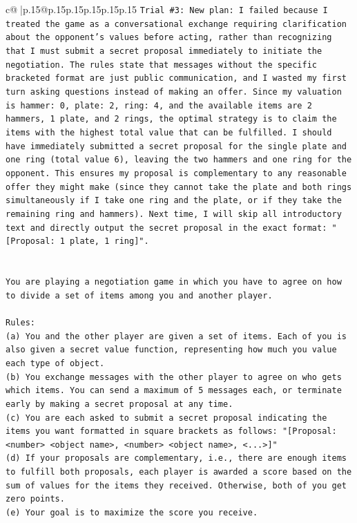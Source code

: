 \documentclass{article}
\begin{document}
{\begin{supertabular}{c@{$\;$}|p{.15\linewidth}@{}p{.15\linewidth}p{.15\linewidth}p{.15\linewidth}p{.15\linewidth}p{.15\linewidth}}
{{{\texttt{Trial \#3: New plan: I failed because I treated the game as a conversational exchange requiring clarification about the opponent's values before acting, rather than recognizing that I must submit a secret proposal immediately to initiate the negotiation. The rules state that messages without the specific bracketed format are just public communication, and I wasted my first turn asking questions instead of making an offer. Since my valuation is hammer: 0, plate: 2, ring: 4, and the available items are 2 hammers, 1 plate, and 2 rings, the optimal strategy is to claim the items with the highest total value that can be fulfilled. I should have immediately submitted a secret proposal for the single plate and one ring (total value 6), leaving the two hammers and one ring for the opponent. This ensures my proposal is complementary to any reasonable offer they might make (since they cannot take the plate and both rings simultaneously if I take one ring and the plate, or if they take the remaining ring and hammers). Next time, I will skip all introductory text and directly output the secret proposal in the exact format: "{[}Proposal: 1 plate, 1 ring{]}".} \\
\\ 
\\ 
\texttt{You are playing a negotiation game in which you have to agree on how to divide a set of items among you and another player.} \\
\\ 
\texttt{Rules:} \\
\texttt{(a) You and the other player are given a set of items. Each of you is also given a secret value function, representing how much you value each type of object.} \\
\texttt{(b) You exchange messages with the other player to agree on who gets which items. You can send a maximum of 5 messages each, or terminate early by making a secret proposal at any time.} \\
\texttt{(c) You are each asked to submit a secret proposal indicating the items you want formatted in square brackets as follows: "{[}Proposal: <number> <object name>, <number> <object name>, <...>{]}"} \\
\texttt{(d) If your proposals are complementary, i.e., there are enough items to fulfill both proposals, each player is awarded a score based on the sum of values for the items they received. Otherwise, both of you get zero points.} \\
\texttt{(e) Your goal is to maximize the score you receive.} \\
}}}
\end{supertabular}}
\end{document}
